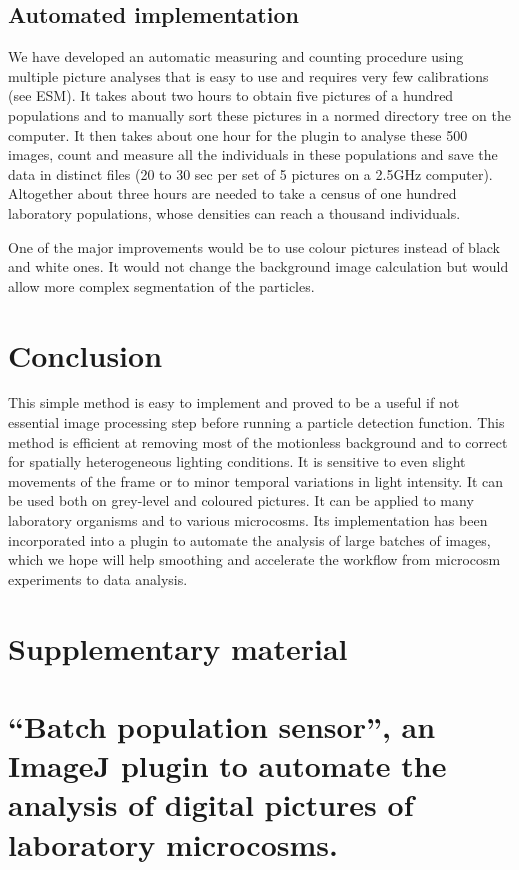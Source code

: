 \subsection{Automated implementation}

We have developed an automatic measuring and counting procedure using multiple
picture analyses that is easy to use and requires very few calibrations (see
ESM). It takes about two hours to obtain five pictures of a hundred populations
and to manually sort these pictures in a normed directory tree on the computer.
It then takes about one hour for the plugin to analyse these 500 images, count
and measure all the individuals in these populations and save the data in
distinct files (20 to 30 sec per set of 5 pictures on a 2.5GHz computer).
Altogether about three hours are needed to take a census of one hundred
laboratory populations, whose densities can reach a thousand individuals.

One of the major improvements would be to use colour pictures instead of black
and white ones. It would not change the background image calculation but would
allow more complex segmentation of the particles.

\section{Conclusion}

This simple method is easy to implement and proved to be a useful if not
essential image processing step before running a particle detection function.
This method is efficient at removing most of the motionless background and to
correct for spatially heterogeneous lighting conditions. It is sensitive to even
slight movements of the frame or to minor temporal variations in light
intensity. It can be used both on grey-level and coloured pictures. It can be
applied to many laboratory organisms and to various microcosms. Its
implementation has been incorporated into a plugin to automate the analysis of
large batches of images, which we hope will help smoothing and accelerate the
workflow from microcosm experiments to data analysis.

\section{Supplementary material}\label{21-SM1}
\section*{“Batch population
sensor”, an ImageJ plugin to automate the analysis of digital pictures of laboratory
microcosms.}

